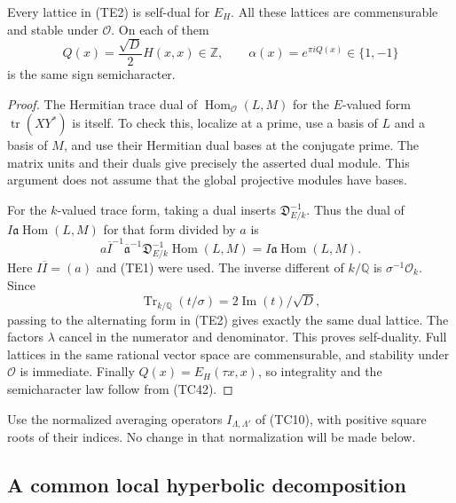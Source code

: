 \begin{lemma}\label{te-trace-lattice}
Every lattice in (TE2) is self-dual for $E_H$.
All these lattices are commensurable and stable under
$\mathcal O$.  On each of them
\[
       Q(x)=\frac{\sqrt D}{2}H(x,x)\in\mathbb Z,
                    \qquad \alpha(x)=e^{\pi iQ(x)}\in\{1,-1\}
 \tag{TE3}
\]
is the same sign semicharacter.
\end{lemma}
\begin{proof}
The Hermitian trace dual of
$\operatorname{Hom}_{\mathcal O}(L,M)$ for the $E$-valued
form $\operatorname{tr}(XY^*)$ is itself.  To check this,
localize at a prime, use a basis of $L$ and a basis of $M$,
and use their Hermitian dual bases at the conjugate prime.
The matrix units and their duals give precisely the asserted
dual module.  This argument does not assume that the global
projective modules have bases.

For the $k$-valued trace form, taking a dual inserts
$\mathfrak D_{E/k}^{-1}$.  Thus the dual of
$I\mathfrak a\operatorname{Hom}(L,M)$ for that form divided
by $a$ is
\[
 a\overline I^{-1}\overline{\mathfrak a}^{-1}
       \mathfrak D_{E/k}^{-1}\operatorname{Hom}(L,M)
             =I\mathfrak a\operatorname{Hom}(L,M).
\]
Here $I\overline I=(a)$ and (TE1) were used.
The inverse different of $k/\mathbb Q$ is
$\sigma^{-1}\mathcal O_k$.  Since
\[
 \operatorname{Tr}_{k/\mathbb Q}(t/\sigma)
                              =2\operatorname{Im}(t)/\sqrt D,
\]
passing to the alternating form in (TE2) gives exactly
the same dual lattice.  The factors $\lambda$ cancel in
the numerator and denominator.  This proves self-duality.
Full lattices in the same rational vector space are
commensurable, and stability under $\mathcal O$ is immediate.
Finally $Q(x)=E_H(\tau x,x)$, so integrality and the
semicharacter law follow from (TC42).
\end{proof}

Use the normalized averaging operators $I_{\Lambda,\Lambda'}$
of (TC10), with positive square roots of their indices.
No change in that normalization will be made below.

\subsection{A common local hyperbolic decomposition}

